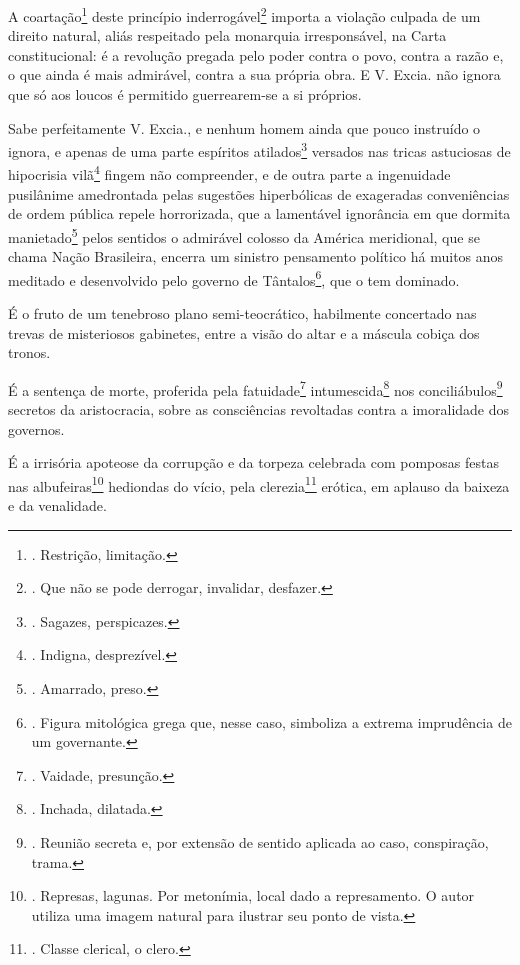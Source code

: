 A coartação\footnote{. Restrição, limitação.} deste princípio
inderrogável\footnote{. Que não se pode derrogar, invalidar, desfazer.}
importa a violação culpada de um direito natural, aliás respeitado pela
monarquia irresponsável, na Carta constitucional: é a revolução pregada
pelo poder contra o povo, contra a razão e, o que ainda é mais
admirável, contra a sua própria obra. E V. Excia. não ignora que só aos
loucos é permitido guerrearem-se a si próprios.

Sabe perfeitamente V. Excia., e nenhum homem ainda que pouco instruído o
ignora, e apenas de uma parte espíritos atilados\footnote{. Sagazes,
  perspicazes.} versados nas tricas astuciosas de hipocrisia
vilã\footnote{. Indigna, desprezível.} fingem não compreender, e de
outra parte a ingenuidade pusilânime amedrontada pelas sugestões
hiperbólicas de exageradas conveniências de ordem pública repele
horrorizada, que a lamentável ignorância em que dormita
manietado\footnote{. Amarrado, preso.} pelos sentidos o admirável
colosso da América meridional, que se chama Nação Brasileira, encerra um
sinistro pensamento político há muitos anos meditado e desenvolvido pelo
governo de Tântalos\footnote{. Figura mitológica grega que, nesse caso,
  simboliza a extrema imprudência de um governante.}, que o tem
dominado.

É o fruto de um tenebroso plano semi-teocrático, habilmente concertado
nas trevas de misteriosos gabinetes, entre a visão do altar e a máscula
cobiça dos tronos.

É a sentença de morte, proferida pela fatuidade\footnote{. Vaidade,
  presunção.} intumescida\footnote{. Inchada, dilatada.} nos
conciliábulos\footnote{. Reunião secreta e, por extensão de sentido
  aplicada ao caso, conspiração, trama.} secretos da aristocracia, sobre
as consciências revoltadas contra a imoralidade dos governos.

É a irrisória apoteose da corrupção e da torpeza celebrada com pomposas
festas nas albufeiras\footnote{. Represas, lagunas. Por metonímia, local
  dado a represamento. O autor utiliza uma imagem natural para ilustrar
  seu ponto de vista.} hediondas do vício, pela clerezia\footnote{.
  Classe clerical, o clero.} erótica, em aplauso da baixeza e da
venalidade.

